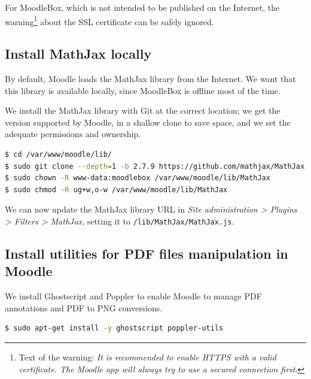 \documentclass[12pt]{article}
\begin{document}
For MoodleBox, which is not intended to be published on the Internet, the warning\footnote{Text of the warning: \textsl{It is recommended to enable HTTPS with a valid certificate. The Moodle app will always try to use a secured connection first}.} about the SSL certificate can be safely ignored.

\subsection{Install MathJax locally}

By default, Moodle loads the MathJax library from the Internet.
We want that this library is available locally, since MoodleBox is offline most of the time.

We install the MathJax library with Git at the correct location; we get the version supported by Moodle, in a shallow clone to save space, and we set the adequate permissions and ownership.
\begin{lstlisting}[language=bash]
$ cd /var/www/moodle/lib/
$ sudo git clone --depth=1 -b 2.7.9 https://github.com/mathjax/MathJax.git MathJax
$ sudo chown -R www-data:moodlebox /var/www/moodle/lib/MathJax
$ sudo chmod -R ug+w,o-w /var/www/moodle/lib/MathJax
\end{lstlisting}

We can now update the MathJax library URL in \emph{Site administration > Plugins > Filters > MathJax}, setting it to \lstinline{/lib/MathJax/MathJax.js}.

\subsection{Install utilities for PDF files manipulation in Moodle}

We install Ghostscript and Poppler to enable Moodle to manage PDF annotations and PDF to PNG conversions.
\begin{lstlisting}[language=bash]
$ sudo apt-get install -y ghostscript poppler-utils
\end{lstlisting}
\end{document}
